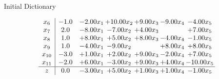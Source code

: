 \documentclass[8pt]{article}
\begin{document}
Initial Dictionary 

\[\begin{array}{c| c c@{\hskip 2pt} c@{\hskip 2pt} c@{\hskip 2pt} c@{\hskip 2pt} c@{\hskip 2pt} }
 x_{6}   &  -1.0 & -2.00 x_{1} & + 10.00 x_{2} & +  9.00 x_{3} & -9.00 x_{4} & -4.00 x_{5}\\
 x_{7}   &  2.0 & -8.00 x_{1} & -7.00 x_{2} & +  4.00 x_{3} &   & +  7.00 x_{5}\\
 x_{8}   &  1.0 & +  8.00 x_{1} & +  5.00 x_{2} & +  8.00 x_{3} & -4.00 x_{4} & -1.00 x_{5}\\
 x_{9}   &  1.0 & -4.00 x_{1} & -9.00 x_{2} &   & +  8.00 x_{4} & +  8.00 x_{5}\\
 x_{10}   &  -3.0 & +  1.00 x_{1} & +  2.00 x_{2} & +  9.00 x_{3} & -2.00 x_{4} & +  7.00 x_{5}\\
 x_{11}   &  -2.0 & +  6.00 x_{1} & -3.00 x_{2} & +  9.00 x_{3} & +  4.00 x_{4} & -10.00 x_{5}\\
\hline
z    &  0.0 & -3.00 x_{1} & +  5.00 x_{2} & +  1.00 x_{3} & +  1.00 x_{4} & -1.00 x_{5}\\
\end{array}\]
\end{document}

